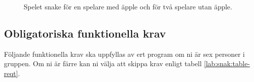 \begin{figure}[H]
\begin{minipage}{0.5\textwidth}
\end{minipage}
\caption{Spelet snake för en spelare med äpple och för två spelare utan äpple. \label{fig:snake-game}}
\end{figure}

\subsection{Obligatoriska funktionella krav}

Följande funktionella krav ska uppfyllas av ert program om ni är sex personer i gruppen. Om ni är färre kan ni välja att skippa krav enligt tabell \ref{lab:snak:table-reqt}.
